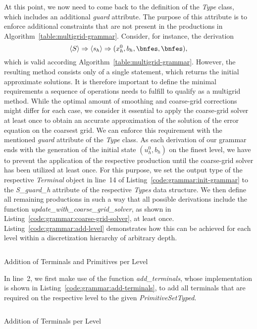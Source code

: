 At this point, we now need to come back to the definition of the \emph{Type} class, which includes an additional \emph{guard} attribute.
The purpose of this attribute is to enforce additional constraints that are not present in the productions in Algorithm~\ref{table:multigrid-grammar}.
Consider, for instance, the derivation
\begin{equation*}
\ps{S} \Rightarrow \ps{s_h} \Rightarrow (x_h^0, b_h, \bnfes, \bnfes),
\end{equation*}
which is valid according Algorithm~\ref{table:multigrid-grammar}.
However, the resulting method consists only of a single statement, which returns the initial approximate solutions.
It is therefore important to define the minimal requirements a sequence of operations needs to fulfill to qualify as a multigrid method. 
While the optimal amount of smoothing and coarse-grid corrections might differ for each case, we consider it essential to apply the coarse-grid solver at least once to obtain an accurate approximation of the solution of the error equation on the coarsest grid.
We can enforce this requirement with the mentioned \emph{guard} attribute of the \emph{Type} class.
As each derivation of our grammar ends with the generation of the initial state $\left(u_h^0, b_h\right)$ on the finest level, we have to prevent the application of the respective production until the coarse-grid solver has been utilized at least once.
For this purpose, we set the output type of the respective \emph{Terminal} object in line~14 of Listing~\ref{code:grammar:init-grammar} to the \emph{S\_guard\_h} attribute of the respective \emph{Types} data structure.
We then define all remaining productions in such a way that all possible derivations include the function \emph{update\_with\_coarse\_grid\_solver}, as shown in Listing~\ref{code:grammar:coarse-grid-solver}, at least once.
Listing~\ref{code:grammar:add-level} demonstrates how this can be achieved for each level within a discretization hierarchy of arbitrary depth.
\begin{listing}
	\inputminted[linenos]{python}{evostencils/grammar/add_level.py}
	\caption{Addition of Terminals and Primitives per Level}
	\label{code:grammar:add-level}
\end{listing}
In line~2, we first make use of the function \emph{add\_terminals}, whose implementation is shown in Listing~\ref{code:grammar:add-terminals}, to add all terminals that are required on the respective level to the given \emph{PrimitiveSetTyped}.
\begin{listing}
	\inputminted{python}{evostencils/grammar/add_terminals.py}
	\caption{Addition of Terminals per Level}
	\label{code:grammar:add-terminals}
\end{listing}
